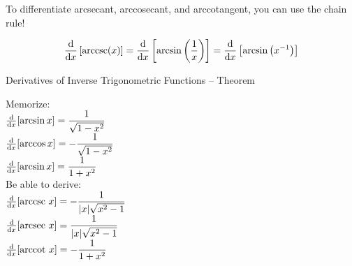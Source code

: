 \begin{frame}[t]
\begin{QuestionSet}
{}

\end{QuestionSet}
\end{frame}

\begin{frame}[t]
To differentiate arcsecant, arccosecant, and arccotangent, you can use the chain rule!\pause

\color{answercolor}
\[\frac{\text{d}}{\text{d}x}\left[ \text{arccsc}(x)\right]=\frac{\text{d}}{\text{d}x}\left[\arcsin\left(\frac{1}{x}\right)\right]=\frac{\text{d}}{\text{d}x}\left[\arcsin\left(x^{-1}\right)\right]\]\pause


\end{frame}

\begin{frame}
\begin{block}{Derivatives of Inverse Trigonometric Functions -- Theorem~}
\begin{multicols}{2}
\color{answercolor}
Memorize:\\[1em]
$\frac{\text{d}}{\text{d}x}[\arcsin x] = \dfrac{1}{\sqrt{ 1-x^2}}$\\
$\frac{\text{d}}{\text{d}x}[\arccos x] = -\dfrac{1}{\sqrt{ 1-x^2}}$\\
$\frac{\text{d}}{\text{d}x}[\arcsin x] = \dfrac{1}{ 1+x^2}$\\
\columnbreak 
\color{black}
Be able to derive:\\[1em]
$\frac{\text{d}}{\text{d}x}[\text{arccsc}~ x]=-\dfrac{1}{|x|\sqrt{x^2-1}}$\\
$\frac{\text{d}}{\text{d}x}[\text{arcsec}~ x]=\dfrac{1}{|x|\sqrt{x^2-1}}$\\
$\frac{\text{d}}{\text{d}x}[\text{arccot}~ x]=-\dfrac{1}{1+x^2}$\\ $ $
\end{multicols}
\end{block}

\end{frame}
